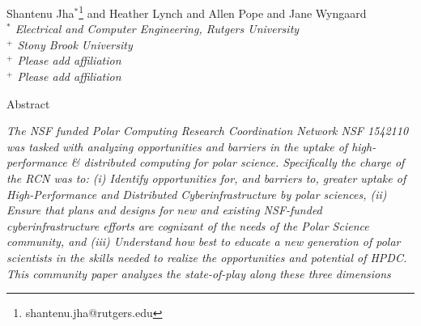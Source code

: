 \documentclass[10pt,letterpaper,draft]{article}
\date{}
\begin{document}
\title{\bf }

\maketitle

\vspace{-0.9in}





\renewcommand{\thepage}{\arabic{page}}


\thispagestyle{empty}
\begin{center} 

\vspace{0.25in}
\large Shantenu Jha$^{*}$\footnote{shantenu.jha@rutgers.edu} and 
       Heather Lynch and 
       Allen Pope    and
       Jane Wyngaard \\

\small {\it $^*$ Electrical and Computer Engineering, Rutgers University} \\
\small {\it $^+$ Stony Brook University} \\
\small {\it $^+$ Please add affiliation} \\
\small {\it $^+$ Please add affiliation}

\vspace{0.25in}
\end{center} 
\begin{center}
	\large Abstract
\end{center}
{\it  The NSF funded Polar Computing Research Coordination Network NSF 1542110~\cite{polar-computing-github} was tasked with analyzing opportunities and barriers in the uptake of high-performance \& distributed computing for polar science. Specifically the charge of the RCN was to: (i) Identify opportunities for, and barriers to, greater uptake of High-Performance and Distributed Cyberinfrastructure by polar sciences, (ii) Ensure that plans and designs for new and existing NSF-funded cyberinfrastructure efforts are cognizant of the needs of the Polar Science community, and (iii) Understand how best to educate a new generation of polar scientists in the skills needed to realize the opportunities and potential of HPDC. This community paper analyzes the state-of-play along these three dimensions }
\end{document}
